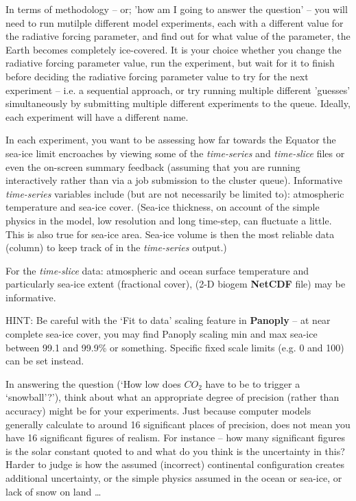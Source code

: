 \noindent 
In terms of methodology -- or; 'how am I going to answer the question' -- you will need to run mutilple different model experiments, each with a different value for the radiative forcing parameter, and find out for what value of the parameter, the Earth becomes completely ice-covered. It is your choice whether you change the radiative forcing parameter value, run the experiment, but wait for it to finish before deciding the radiative forcing parameter value to try for the next experiment -- i.e. a sequential approach, or try running multiple different 'guesses' simultaneously by submitting multiple different experiments to the queue. Ideally, each experiment will have a different name.

In each experiment, you want to be assessing how far towards the Equator the sea-ice limit encroaches by viewing some of the \textit{time-series} and \textit{time-slice} files or even the on-screen summary feedback (assuming that you are running interactively rather than via a job submission to the cluster queue). Informative \textit{time-series} variables include (but are not necessarily be limited to): atmospheric temperature and sea-ice cover. (Sea-ice thickness, on account of the simple physics in the model, low resolution and long time-step, can fluctuate a little. This is also true for sea-ice area. Sea-ice volume is then the most reliable data (column) to keep track of in the \textit{time-series} output.)

For the \textit{time-slice} data: atmospheric and ocean surface temperature and particularly sea-ice extent (fractional cover), (2-D biogem \textbf{NetCDF} file) may be informative.

HINT: Be careful with the ‘\textsf{\footnotesize Fit to data}’ scaling feature in \textbf{Panoply} – at near complete sea-ice cover, you may find Panoply scaling min and max sea-ice between 99.1 and 99.9\% or something. Specific fixed scale limits (e.g. 0 and 100) can be set instead.

In answering the question (‘How low does \(CO_{2}\) have to be to trigger a ‘snowball’?’), think about what an appropriate degree of precision (rather than accuracy) might be for your experiments. Just because computer models generally calculate to around 16 significant places of precision, does not mean you have 16 significant figures of realism. For instance – how many significant figures is the solar constant quoted to and what do you think is the uncertainty in this? Harder to judge is how the assumed (incorrect) continental configuration creates additional uncertainty, or the simple physics assumed in the ocean or sea-ice, or lack of snow on land …

